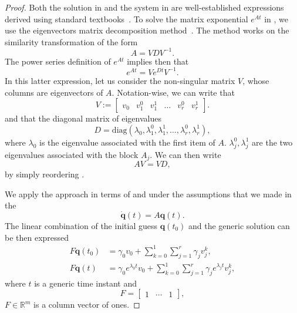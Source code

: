 \begin{proof}
Both the solution in  and the system in  are well-established expressions derived using standard textbooks~\citep{kuo1967automatic, ogata2002modern}. 
To solve the matrix exponential $e^{At}$ in , we use the eigenvectors matrix decomposition method~\citep{moler2003nineteen}.
The method works on the similarity transformation of the form
\begin{equation}\label{eq:proof-toreorder}
  A=VDV^{-1}.
\end{equation}
The power series definition of $e^{At}$ implies then that~\citep{moler2003nineteen}
\begin{equation}
  e^{At}=Ve^{Dt}V^{-1}.
\end{equation} 
In this latter expression, let us consider the non-singular matrix $V$, whose columns are eigenvectors of $A$. Notation-wise, we can write that  
\begin{equation}
  V:=\begin{bmatrix}v_0 & v_1^0 & v_1^1 & \dots & v_r^0 & v_r^1\end{bmatrix}.
\end{equation}
and that the diagonal matrix of eigenvalues 
\begin{equation}
  D=\mathrm{diag}{(\lambda_0,\lambda_1^0,\lambda_1^1,\dots,\lambda_r^0,\lambda_r^1)},
\end{equation}
where $\lambda_0$ is the eigenvalue associated with the first item of $A$. $\lambda_j^0,\lambda_j^1$ are the two eigenvalues associated with the block $A_j$. We can then write 
\begin{equation}
AV=VD,
\end{equation}
by simply reordering .

We apply the approach in terms of  and under the assumptions that we made in the 
\begin{equation}
  \dot{\mathbf{q}}(t)=A\mathbf{q}(t).
\end{equation}
The linear combination of the initial guess $\mathbf{q}(t_0)$ and the generic solution can be then expressed
\begin{subequations}\begin{align}
  F\mathbf{q}(t_0)&=\gamma_0 v_0+\sum_{k=0}^{1}{\sum_{j=1}^{r}{\gamma_j v_j^k}},\\
  F\mathbf{q}(t)&=\gamma_0 e^{\lambda_0 t} v_0+\sum_{k=0}^{1}{\sum_{j=1}^{r}{\gamma_j e^{\lambda_j t} v_j^k}},\label{eq:proof-comb}
\end{align}\end{subequations}
where $t$ is a generic time instant and
\begin{equation}
  F=\begin{bmatrix}1 & \cdots & 1\end{bmatrix},
\end{equation} 
$F\in\mathbb{R}^m$ is a column vector of ones. 


\end{proof}
